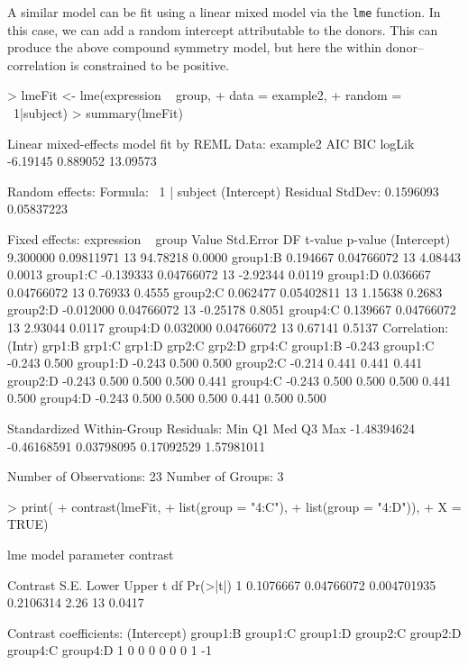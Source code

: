 \documentclass[12pt]{article}
\newcommand{\code}[1]{\mbox{\footnotesize\color{darkblue}\texttt{#1}}}
\renewenvironment{Schunk}{\vspace{\topsep}}{\vspace{\topsep}}
\begin{document}
A similar model can be fit using a linear mixed model via the \code{lme} function. In this case, we can add a random intercept attributable to the donors. This can produce the above compound symmetry model, but here the within donor--correlation is constrained to be positive.
\begin{Schunk}
\begin{Sinput}
> lmeFit <-  lme(expression ~ group, 
+                data = example2, 
+                random = ~1|subject)
> summary(lmeFit)
\end{Sinput}
\begin{Soutput}
Linear mixed-effects model fit by REML
 Data: example2 
       AIC      BIC   logLik
  -6.19145 0.889052 13.09573

Random effects:
 Formula: ~1 | subject
        (Intercept)   Residual
StdDev:   0.1596093 0.05837223

Fixed effects: expression ~ group 
                Value  Std.Error DF  t-value p-value
(Intercept)  9.300000 0.09811971 13 94.78218  0.0000
group1:B     0.194667 0.04766072 13  4.08443  0.0013
group1:C    -0.139333 0.04766072 13 -2.92344  0.0119
group1:D     0.036667 0.04766072 13  0.76933  0.4555
group2:C     0.062477 0.05402811 13  1.15638  0.2683
group2:D    -0.012000 0.04766072 13 -0.25178  0.8051
group4:C     0.139667 0.04766072 13  2.93044  0.0117
group4:D     0.032000 0.04766072 13  0.67141  0.5137
 Correlation: 
         (Intr) grp1:B grp1:C grp1:D grp2:C grp2:D grp4:C
group1:B -0.243                                          
group1:C -0.243  0.500                                   
group1:D -0.243  0.500  0.500                            
group2:C -0.214  0.441  0.441  0.441                     
group2:D -0.243  0.500  0.500  0.500  0.441              
group4:C -0.243  0.500  0.500  0.500  0.441  0.500       
group4:D -0.243  0.500  0.500  0.500  0.441  0.500  0.500

Standardized Within-Group Residuals:
        Min          Q1         Med          Q3         Max 
-1.48394624 -0.46168591  0.03798095  0.17092529  1.57981011 

Number of Observations: 23
Number of Groups: 3 
\end{Soutput}
\begin{Sinput}
> print(
+       contrast(lmeFit, 
+                list(group = "4:C"),
+                list(group = "4:D")),
+       X = TRUE)        
\end{Sinput}
\begin{Soutput}
lme model parameter contrast

   Contrast       S.E.       Lower     Upper    t df Pr(>|t|)
1 0.1076667 0.04766072 0.004701935 0.2106314 2.26 13   0.0417

Contrast coefficients:
  (Intercept) group1:B group1:C group1:D group2:C group2:D group4:C group4:D
1           0        0        0        0        0        0        1       -1
\end{Soutput}
\end{Schunk}
\end{document}
